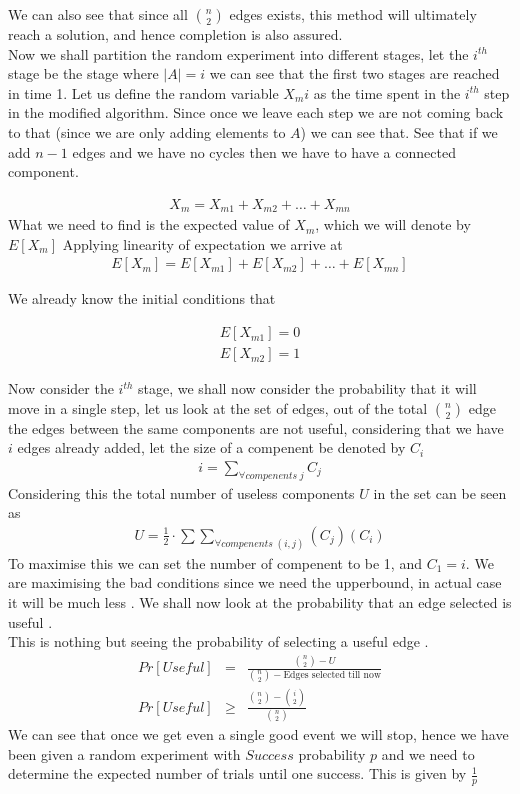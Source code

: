 \documentclass{assignment}
\begin{document}
\begin{problemlist}
\begin{problem}
\begin{answer}
We can also see that since all $\binom{n}{2}$ edges exists, this method will ultimately reach a solution, and hence completion is also assured. \\

Now we shall partition the random experiment into different stages, let the $i^{th}$ stage be the stage where $|A| = i$ we can see that the first two stages are reached in time 1. Let us define the random variable $X_mi$ as the time spent in the $i^{th}$ step in the modified algorithm. Since once we leave each step we are not coming back to that (since we are only adding elements to $A$) we can see that. See that if we add $n-1$ edges and we have no cycles then we have to have a connected component. 

\begin{eqnarray}
 X_m = X_{m1}+ X_{m2} + \ldots + X_{mn}
\end{eqnarray}
What we need to find is the expected value of $X_m$, which we will denote by $E[X_m]$
Applying linearity of expectation we arrive at
\begin{eqnarray}
 E[X_m] = E[X_{m1}]+ E[X_{m2}] + \ldots + E[X_{mn}]
\end{eqnarray}

We already know the initial conditions that 

\begin{eqnarray}
 E[X_{m1}] = 0 \\
 E[X_{m2}] = 1 
\end{eqnarray}

Now consider the $i^{th}$ stage, we shall now consider the probability that it will move in a single step, let us look at the set of edges, out of the total $\binom{n}{2}$ edge the edges between the same components are not useful, considering that we have $i$ edges already added, let the size of a compenent be denoted by $C_i$
\begin{eqnarray}
i =  \sum_{\forall compenents \; j} C_j  
\end{eqnarray}
Considering this the total number of useless components $U$ in the set can be seen as 
\begin{eqnarray}
U =\frac{1}{2} \cdot \sum\sum_{\forall compenents \; (i,j)} (C_j)(C_i)
\end{eqnarray}
To maximise this we can set the number of compenent to be 1, and $C_1=i$. We are maximising the bad conditions  since we need the upperbound, in actual case it will be much less . 
We shall now look at the probability that an edge selected is useful . \\
This is nothing but seeing the probability of selecting a useful edge .
\begin{eqnarray}
Pr[Useful] & = & \frac{\binom{n}{2} - U}{\binom{n}{2} - \textrm{Edges selected till now}}\\
Pr[Useful] & \geq & \frac{\binom{n}{2} - \binom{i}{2}}{\binom{n}{2}} 
\end{eqnarray}
We can see that once we get even a single good event we will stop, hence we have been given a random experiment with $Success$ probability $p$ and we need to determine the expected number of trials until one success. This is given by $\frac{1}{p}$


\end{answer}
\end{problem}
\end{problemlist}
\end{document}
